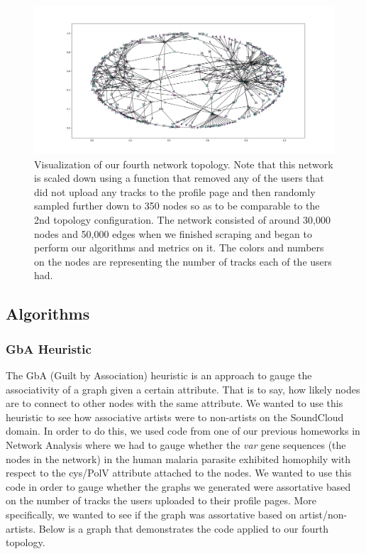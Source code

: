 \documentclass{article}
\begin{document}
\begin{figure}[h]
	\centering
	\includegraphics[scale=0.29]{take_4_visualization}
	\caption{Visualization of our fourth network topology.  Note that this network is scaled down using a function that removed any of the users that did not upload any tracks to the profile page and then randomly sampled further down to 350 nodes so as to be comparable to the 2nd topology configuration.  The network consisted of around 30,000 nodes and 50,000 edges when we finished scraping and began to perform our algorithms and metrics on it.  The colors and numbers on the nodes are representing the number of tracks each of the users had.}
\end{figure}

\subsection{Algorithms}

\subsubsection{GbA Heuristic}
The GbA (Guilt by Association) heuristic is an approach to gauge the associativity of a graph given a certain attribute.  That is to say, how likely nodes are to connect to other nodes with the same attribute.  We wanted to use this heuristic to see how associative artists were to non-artists on the SoundCloud domain. In order to do this, we used code from one of our previous homeworks in Network Analysis where we had to gauge whether the \textit{var} gene sequences (the nodes in the network) in the human malaria parasite exhibited homophily with respect to the cys/PolV attribute attached to the nodes.  We wanted to use this code in order to gauge whether the graphs we generated were assortative based on the number of tracks the users uploaded to their profile pages.  More specifically, we wanted to see if the graph was assortative based on artist/non-artists. Below is a graph that demonstrates the code applied to our fourth topology.
\end{document}
